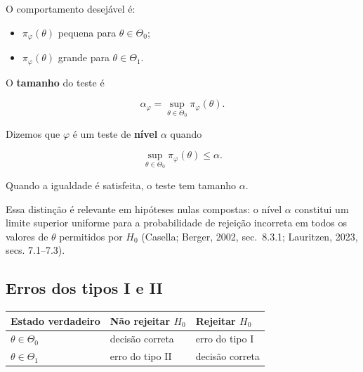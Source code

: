 \documentclass[
  letterpaper,
  DIV=11,
  numbers=noendperiod]{scrreprt}
\providecommand{\tightlist}{%
  \setlength{\itemsep}{0pt}\setlength{\parskip}{0pt}}\usepackage{longtable,booktabs,array}
\begin{document}
O comportamento desejável é:

\begin{itemize}
\tightlist
\item
  \(\pi_\varphi(\theta)\) pequena para \(\theta\in\Theta_0\);
\item
  \(\pi_\varphi(\theta)\) grande para \(\theta\in\Theta_1\).
\end{itemize}

\begin{tcolorbox}[enhanced jigsaw, colback=white, leftrule=.75mm, colbacktitle=quarto-callout-note-color!10!white, breakable, titlerule=0mm, bottomtitle=1mm, title=\textcolor{quarto-callout-note-color}{\faInfo}\hspace{0.5em}{Definição: tamanho e nível}, colframe=quarto-callout-note-color-frame, toprule=.15mm, opacityback=0, bottomrule=.15mm, opacitybacktitle=0.6, arc=.35mm, toptitle=1mm, rightrule=.15mm, coltitle=black, left=2mm]

O \textbf{tamanho} do teste é

\[\alpha_\varphi
=\sup_{\theta\in\Theta_0}\pi_\varphi(\theta).\]

Dizemos que \(\varphi\) é um teste de \textbf{nível} \(\alpha\) quando

\[\sup_{\theta\in\Theta_0}\pi_\varphi(\theta)\leq\alpha.\]

Quando a igualdade é satisfeita, o teste tem tamanho \(\alpha\).

\end{tcolorbox}

Essa distinção é relevante em hipóteses nulas compostas: o nível
\(\alpha\) constitui um limite superior uniforme para a probabilidade de
rejeição incorreta em todos os valores de \(\theta\) permitidos por
\(H_0\) (Casella; Berger, 2002, sec.~8.3.1; Lauritzen, 2023, secs.
7.1--7.3).

\subsection{Erros dos tipos I e II}\label{erros-dos-tipos-i-e-ii}

\begin{longtable}[]{@{}lll@{}}
\toprule\noalign{}
Estado verdadeiro & Não rejeitar \(H_0\) & Rejeitar \(H_0\) \\
\midrule\noalign{}
\endhead
\bottomrule\noalign{}
\endlastfoot
\(\theta\in\Theta_0\) & decisão correta & erro do tipo I \\
\(\theta\in\Theta_1\) & erro do tipo II & decisão correta \\
\end{longtable}
\end{document}
